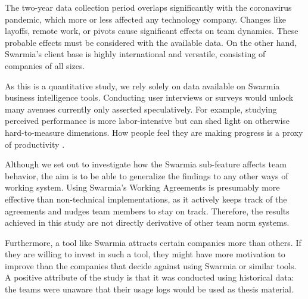 The two-year data collection period overlaps significantly with the coronavirus pandemic, which more or less affected any technology company. Changes like layoffs, remote work, or pivots cause significant effects on team dynamics. These probable effects must be considered with the available data. On the other hand, Swarmia's client base is highly international and versatile, consisting of companies of all sizes. 

As this is a quantitative study, we rely solely on data available on Swarmia business intelligence tools. Conducting user interviews or surveys would unlock many avenues currently only asserted speculatively. For example, studying perceived performance is more labor-intensive but can shed light on otherwise hard-to-measure dimensions. How people feel they are making progress is a proxy of productivity \cite{forsgren_space_2021}.

Although we set out to investigate how the Swarmia sub-feature affects team behavior, the aim is to be able to generalize the findings to any other ways of working system. Using Swarmia's Working Agreements is presumably more effective than non-technical implementations, as it actively keeps track of the agreements and nudges team members to stay on track. Therefore, the results achieved in this study are not directly derivative of other team norm systems. 

Furthermore, a tool like Swarmia attracts certain companies more than others. If they are willing to invest in such a tool, they might have more motivation to improve than the companies that decide against using Swarmia or similar tools. A positive attribute of the study is that it was conducted using historical data: the teams were unaware that their usage logs would be used as thesis material. 